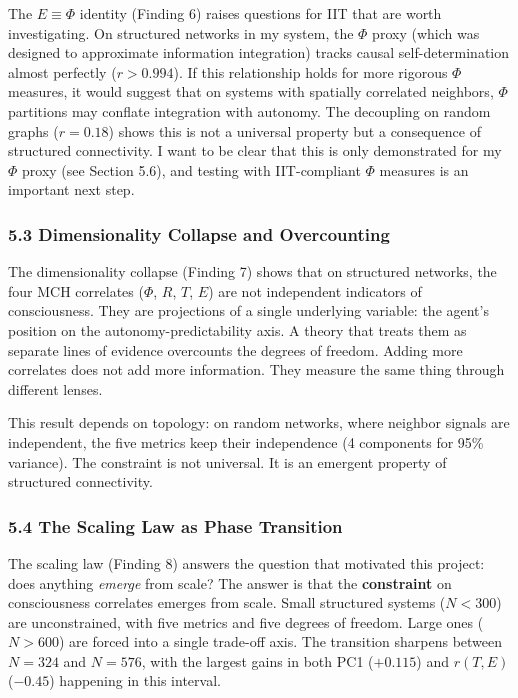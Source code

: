 \documentclass[
  11pt,
]{article}
\begin{document}
The \(E \equiv \Phi\) identity (Finding 6) raises questions for IIT that
are worth investigating. On structured networks in my system, the
\(\Phi\) proxy (which was designed to approximate information
integration) tracks causal self-determination almost perfectly
(\(r > 0.994\)). If this relationship holds for more rigorous \(\Phi\)
measures, it would suggest that on systems with spatially correlated
neighbors, \(\Phi\) partitions may conflate integration with autonomy.
The decoupling on random graphs (\(r = 0.18\)) shows this is not a
universal property but a consequence of structured connectivity. I want
to be clear that this is only demonstrated for my \(\Phi\) proxy (see
Section 5.6), and testing with IIT-compliant \(\Phi\) measures is an
important next step.

\subsubsection{5.3 Dimensionality Collapse and
Overcounting}\label{dimensionality-collapse-and-overcounting}

The dimensionality collapse (Finding 7) shows that on structured
networks, the four MCH correlates (\(\Phi\), \(R\), \(T\), \(E\)) are
not independent indicators of consciousness. They are projections of a
single underlying variable: the agent's position on the
autonomy-predictability axis. A theory that treats them as separate
lines of evidence overcounts the degrees of freedom. Adding more
correlates does not add more information. They measure the same thing
through different lenses.

This result depends on topology: on random networks, where neighbor
signals are independent, the five metrics keep their independence (4
components for 95\% variance). The constraint is not universal. It is an
emergent property of structured connectivity.

\subsubsection{5.4 The Scaling Law as Phase
Transition}\label{the-scaling-law-as-phase-transition}

The scaling law (Finding 8) answers the question that motivated this
project: does anything \emph{emerge} from scale? The answer is that the
\textbf{constraint} on consciousness correlates emerges from scale.
Small structured systems (\(N < 300\)) are unconstrained, with five
metrics and five degrees of freedom. Large ones (\(N > 600\)) are forced
into a single trade-off axis. The transition sharpens between
\(N = 324\) and \(N = 576\), with the largest gains in both PC1
(\(+0.115\)) and \(r(T,E)\) (\(-0.45\)) happening in this interval.
\end{document}
